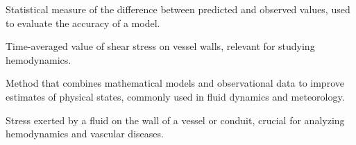  Statistical measure of the difference between predicted and observed values, used to evaluate the accuracy of a model.

 Time-averaged value of shear stress on vessel walls, relevant for studying hemodynamics.

 Method that combines mathematical models and observational data to improve estimates of physical states, commonly used in fluid dynamics and meteorology.

 Stress exerted by a fluid on the wall of a vessel or conduit, crucial for analyzing hemodynamics and vascular diseases.